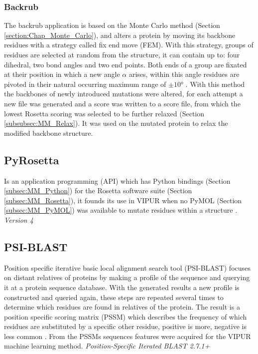 \subsubsection{Backrub}
The backrub application is based on the Monte Carlo method (Section \ref{section:Chap_Monte_Carlo}), and alters a protein by moving its backbone residues with a strategy called fix end move (FEM). With this strategy, groups of residues are selected at random from the structure, it can contain up to: four dihedral, two bond angles and two end points. Both ends of a group are fixated at their position in which a new angle $\alpha$ arises, within this angle residues are pivoted in their natural occurring maximum range of $\pm \ang{10}$ \cite{betancourt_efficient_2005, smith_backrub_nodate}.
With this method the backbones of newly introduced mutations were altered, for each attempt a new file was generated and a score was written to a score file, from which the lowest Rosetta scoring was selected to be further relaxed (Section \ref{subsubsec:MM_Relax}).
It was used on the mutated protein to relax the modified backbone structure.
\label{subsubsec:MM_Backrub}

\subsection{PyRosetta}
Is an application programming (API) which has Python bindings (Section \ref{subsec:MM_Python}) for the Rosetta software suite (Section \ref{subsec:MM_Rosetta}), it founds its use in VIPUR when no PyMOL (Section \ref{subsec:MM_PyMOL}) was available to mutate residues within a structure \cite{jeffrey_pyrosetta_nodate}.
\label{subsec:MM_PyRosetta}
\newline
\textit{Version 4}

\subsection{PSI-BLAST}
Position specific iterative basic local alignment search tool (PSI-BLAST) focuses on distant relatives of proteins by making a profile of the sequence and querying it at a protein sequence database. With the generated results a new profile is constructed and queried again, these steps are repeated several times to determine which residues are found in relatives of the protein. The result is a position specific scoring matrix (PSSM) which describes the frequency of which residues are substituted by a specific other residue, positive is more, negative is less common \cite{ncbi_psiblast_nodate,ncbi_pssm_nodate,wikipedia_blast_2019}.
From the PSSMs sequences features were acquired for the VIPUR machine learning method.
\label{subsec:MM_PSI_BLAST}
\newline
\textit{Position-Specific Iterated BLAST 2.7.1+}

